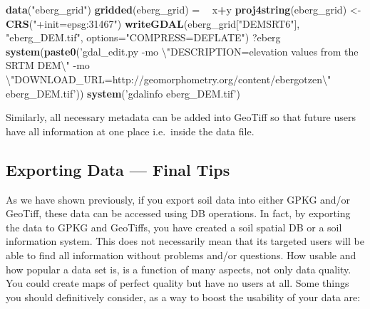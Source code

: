 \documentclass[10pt,b5paper,]{book}
\newenvironment{Shaded}{\begin{snugshade}}{\end{snugshade}}
\newcommand{\CharTok}[1]{\textcolor[rgb]{0.31,0.60,0.02}{#1}}
\newcommand{\DataTypeTok}[1]{\textcolor[rgb]{0.13,0.29,0.53}{#1}}
\newcommand{\ErrorTok}[1]{\textcolor[rgb]{0.64,0.00,0.00}{\textbf{#1}}}
\newcommand{\KeywordTok}[1]{\textcolor[rgb]{0.13,0.29,0.53}{\textbf{#1}}}
\newcommand{\NormalTok}[1]{#1}
\newcommand{\OperatorTok}[1]{\textcolor[rgb]{0.81,0.36,0.00}{\textbf{#1}}}
\newcommand{\StringTok}[1]{\textcolor[rgb]{0.31,0.60,0.02}{#1}}
\theoremstyle{definition}
\theoremstyle{definition}
\theoremstyle{definition}
\theoremstyle{remark}
\begin{document}
\begin{Shaded}
\begin{Highlighting}[]
\KeywordTok{data}\NormalTok{(}\StringTok{"eberg_grid"}\NormalTok{)}
\KeywordTok{gridded}\NormalTok{(eberg_grid) =}\StringTok{ }\ErrorTok{~}\StringTok{ }\NormalTok{x}\OperatorTok{+}\NormalTok{y}
\KeywordTok{proj4string}\NormalTok{(eberg_grid) <-}\StringTok{ }\KeywordTok{CRS}\NormalTok{(}\StringTok{"+init=epsg:31467"}\NormalTok{)}
\KeywordTok{writeGDAL}\NormalTok{(eberg_grid[}\StringTok{"DEMSRT6"}\NormalTok{], }\StringTok{"eberg_DEM.tif"}\NormalTok{, }
            \DataTypeTok{options=}\StringTok{"COMPRESS=DEFLATE"}\NormalTok{)}
\NormalTok{?eberg}
\KeywordTok{system}\NormalTok{(}\KeywordTok{paste0}\NormalTok{(}\StringTok{'gdal_edit.py }
\StringTok{-mo }\CharTok{\textbackslash{}"}\StringTok{DESCRIPTION=elevation values from the SRTM DEM}\CharTok{\textbackslash{}"}\StringTok{ }
\StringTok{-mo }\CharTok{\textbackslash{}"}\StringTok{DOWNLOAD_URL=http://geomorphometry.org/content/ebergotzen}\CharTok{\textbackslash{}"}
\StringTok{eberg_DEM.tif'}\NormalTok{))}
\KeywordTok{system}\NormalTok{(}\StringTok{'gdalinfo eberg_DEM.tif'}\NormalTok{)}
\end{Highlighting}
\end{Shaded}

Similarly, all necessary metadata can be added into GeoTiff so that
future users have all information at one place i.e.~inside the data
file.

\hypertarget{exporting-data-final-tips}{%
\subsection{Exporting Data --- Final
Tips}\label{exporting-data-final-tips}}

As we have shown previously, if you export soil data into either GPKG
and/or GeoTiff, these data can be accessed using DB operations. In fact,
by exporting the data to GPKG and GeoTiffs, you have created a soil
spatial DB or a soil information system. This does not necessarily mean
that its targeted users will be able to find all information without
problems and/or questions. How usable and how popular a data set is, is
a function of many aspects, not only data quality. You could create maps
of perfect quality but have no users at all. Some things you should
definitively consider, as a way to boost the usability of your data are:
\end{document}
